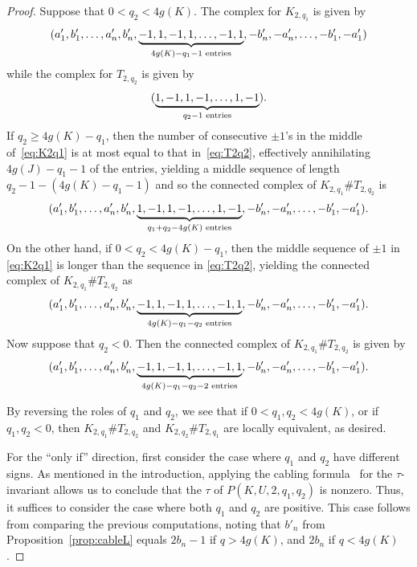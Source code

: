 \documentclass[11pt, reqno]{amsart}
\theoremstyle{definition}
\theoremstyle{remark}
\numberwithin{equation}{section}
\begin{document}
\begin{proof}
Suppose that $0 < q_2 < 4g(K)$. The complex for $K_{2, q_1}$ is given by
\begin{equation}\label{eq:K2q1}
(a'_1, b'_1, \dots, a'_n, b'_n, \underbrace{-1, 1, -1, 1, \dots, -1, 1}_{4g(K)-q_1-1 \textup{ entries}}, -b'_n, -a'_n, \dots, -b'_1, -a'_1)
\end{equation}
while the complex for $T_{2, q_2}$ is given by
\begin{equation}\label{eq:T2q2}
 (\underbrace{1, -1, 1, -1, \dots, 1, -1}_{q_2-1\textup{ entries}}).
\end{equation}
If $q_2 \geq 4g(K) - q_1$, then the number of consecutive $\pm 1$'s in the middle of~\eqref{eq:K2q1} is at most equal to that in~\eqref{eq:T2q2}, effectively annihilating $4g(J)-q_1-1$ of the entries, yielding a middle sequence of length $q_2-1-(4g(K)-q_1-1)$ and so the connected complex of  $K_{2, q_1} \# T_{2, q_2}$ is
\[ (a'_1, b'_1, \dots, a'_n, b'_n, \underbrace{1, -1, 1, -1, \dots, 1, -1}_{q_1+q_2 -4g(K)\textup{ entries}}, -b'_n, -a'_n, \dots, -b'_1, -a'_1). \]
On the other hand, if $0<q_2 < 4g(K)-q_1$, then the middle sequence of $\pm 1$ in \eqref{eq:K2q1} is longer than the sequence in \eqref{eq:T2q2}, yielding the connected complex of  $K_{2, q_1} \# T_{2, q_2}$ as
\[ (a'_1, b'_1, \dots, a'_n, b'_n, \underbrace{-1, 1, -1, 1, \dots, -1, 1}_{4g(K)-q_1-q_2\textup{ entries}}, -b'_n, -a'_n, \dots, -b'_1, -a'_1).\]
Now suppose that $q_2<0$. Then the connected complex of  $K_{2, q_1} \# T_{2, q_2}$ is given by
\[ (a'_1, b'_1, \dots, a'_n, b'_n, \underbrace{-1, 1, -1, 1, \dots, -1, 1}_{4g(K)-q_1-q_2-2\textup{ entries}}, -b'_n, -a'_n, \dots, -b'_1, -a'_1).\]

By reversing the roles of $q_1$ and $q_2$, we see that if $0 < q_1, q_2 < 4g(K)$, or if $q_1, q_2<0$, then $K_{2, q_1} \# T_{2, q_2}$ and $K_{2, q_2} \# T_{2, q_1}$ are locally equivalent, as desired.


For the ``only if'' direction, first consider the case where $q_1$ and $q_2$ have different signs. As mentioned in the introduction, applying the cabling formula~\cite{Hom:2014} for the $\tau$-invariant allows us to conclude that the $\tau$ of $P(K, U, 2, q_1, q_2)$ is nonzero. Thus, it suffices to consider the case where both $q_1$ and $q_2$ are positive. This case follows from comparing the previous computations, noting that $b'_n$ from Proposition~\ref{prop:cableL} equals $2b_n - 1$ if $q > 4g(K)$, and $2b_n$ if $q < 4g(K)$.


\end{proof}
\end{document}

